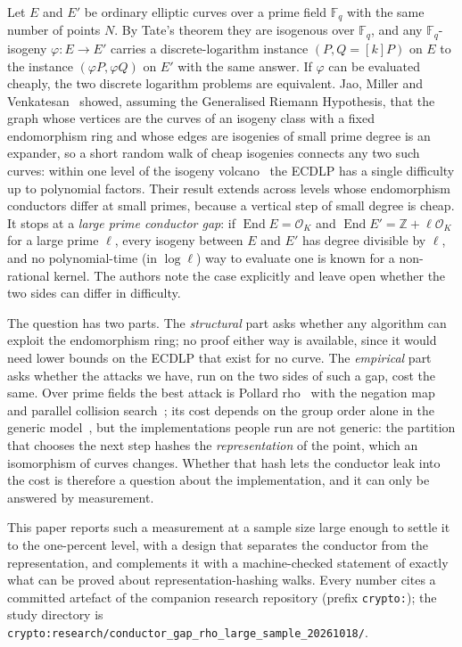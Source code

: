 \documentclass[10pt,a4paper]{article}
\newcommand{\FF}{\mathbb{F}}
\newcommand{\ZZ}{\mathbb{Z}}
\newcommand{\OK}{\mathcal{O}_K}
\newcommand{\End}{\operatorname{End}}
\newcommand{\artefact}[1]{\texttt{\small #1}}
\theoremstyle{remark}
\begin{document}
Let $E$ and $E'$ be ordinary elliptic curves over a prime field $\FF_q$
with the same number of points $N$. By Tate's theorem they are isogenous
over $\FF_q$, and any $\FF_q$-isogeny $\varphi\colon E \to E'$ carries a
discrete-logarithm instance $(P, Q = [k]P)$ on $E$ to the instance
$(\varphi P, \varphi Q)$ on $E'$ with the same answer. If $\varphi$ can be
evaluated cheaply, the two discrete logarithm problems are equivalent.
Jao, Miller and Venkatesan~\cite{JMV2005,JMV2009} showed, assuming the
Generalised Riemann Hypothesis, that the graph whose vertices are the
curves of an isogeny class with a fixed endomorphism ring and whose edges
are isogenies of small prime degree is an expander, so a short random
walk of cheap isogenies connects any two such curves: within one level
of the isogeny volcano~\cite{Kohel1996,FouquetMorain2002,Sutherland2013}
the ECDLP has a single difficulty up to polynomial factors. Their result
extends across levels whose endomorphism conductors differ at small
primes, because a vertical step of small degree is cheap. It stops at a
\emph{large prime conductor gap}: if $\End E = \OK$ and
$\End E' = \ZZ + \ell\OK$ for a large prime $\ell$, every isogeny between
$E$ and $E'$ has degree divisible by $\ell$, and no polynomial-time (in
$\log \ell$) way to evaluate one is known for a non-rational kernel. The
authors note the case explicitly and leave open whether the two sides
can differ in difficulty.

The question has two parts. The \emph{structural} part asks whether any
algorithm can exploit the endomorphism ring; no proof either way is
available, since it would need lower bounds on the ECDLP that exist for
no curve. The \emph{empirical} part asks whether the attacks we have,
run on the two sides of such a gap, cost the same. Over prime fields the
best attack is Pollard rho~\cite{Pollard1978} with the negation
map~\cite{BernsteinLangeSchwabe2011} and parallel collision
search~\cite{vOW1999}; its cost depends on the group order alone in the
generic model~\cite{Nechaev1994,Shoup1997}, but the implementations
people run are not generic: the partition that chooses the next step
hashes the \emph{representation} of the point, which an isomorphism of
curves changes. Whether that hash lets the conductor leak into the cost
is therefore a question about the implementation, and it can only be
answered by measurement.

This paper reports such a measurement at a sample size large enough to
settle it to the one-percent level, with a design that separates the
conductor from the representation, and complements it with a
machine-checked statement of exactly what can be proved about
representation-hashing walks. Every number cites a committed artefact of
the companion research repository (prefix \artefact{crypto:}); the study
directory is
\artefact{crypto:research/conductor\_gap\_rho\_large\_sample\_20261018/}.
\end{document}
